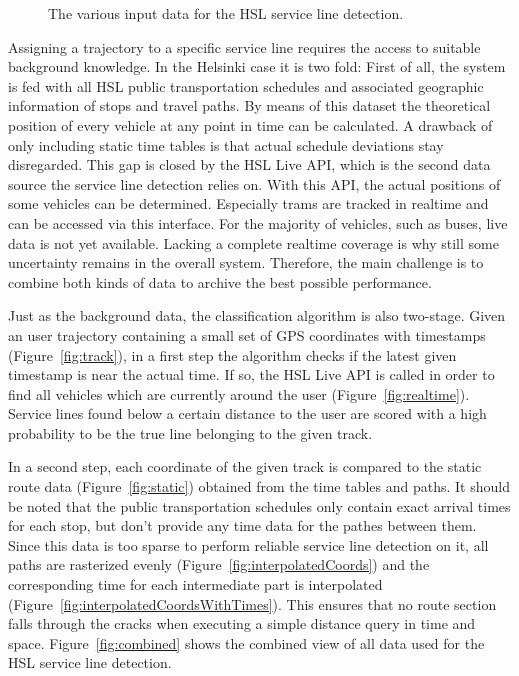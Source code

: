 \begin{figure}[ht]
{  \label{fig:interpolatedCoordsWithTimes}
  \setcounter{subfigure}{5}
} 
\caption{
The various input data for the HSL service line detection.
}
\label{fig:SLD}
\end{figure}

Assigning a trajectory to a specific service line requires the access
to suitable background knowledge. In the Helsinki case it is two fold:
First of all, the system is fed with all HSL public transportation
schedules and associated geographic information of stops and travel
paths. By means of this dataset the theoretical position of every
vehicle at any point in time can be calculated. A drawback of only
including static time tables is that actual schedule deviations stay
disregarded. This gap is closed by the HSL Live API, which is the
second data source the service line detection relies on. With this
API, the actual positions of some vehicles can be
determined. Especially trams are tracked in realtime and can be
accessed via this interface.  For the majority of vehicles, such as
buses, live data is not yet available. Lacking a complete realtime
coverage is why still some uncertainty remains in the overall
system. Therefore, the main challenge is to combine both kinds of data
to archive the best possible performance.

Just as the background data, the classification algorithm is also
two-stage. Given an user trajectory containing a small set of GPS
coordinates with timestamps (Figure~\ref{fig:track}), in a first step
the algorithm checks if the latest given timestamp is near the actual
time. If so, the HSL Live API is called in order to find all vehicles
which are currently around the user
(Figure~\ref{fig:realtime}). Service lines found below a certain
distance to the user are scored with a high probability to be the true
line belonging to the given track.

In a second step, each coordinate of the given track is compared to
the static route data (Figure~\ref{fig:static}) obtained from the time
tables and paths.  It should be noted that the public transportation
schedules only contain exact arrival times for each stop, but don't
provide any time data for the pathes between them. Since this data is
too sparse to perform reliable service line detection on it, all paths
are rasterized evenly (Figure~\ref{fig:interpolatedCoords}) and the
corresponding time for each intermediate part is interpolated
(Figure~\ref{fig:interpolatedCoordsWithTimes}). This ensures that no
route section falls through the cracks when executing a simple
distance query in time and space. Figure~\ref{fig:combined} shows the
combined view of all data used for the HSL service line detection.

